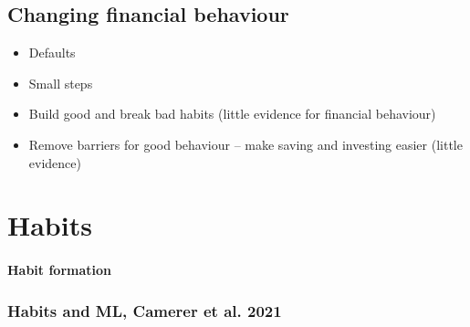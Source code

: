 \documentclass[a4paper, 11pt]{report}
\begin{document}
					\chapter{Changing financial behaviour}

\begin{itemize}
	\item Defaults \citep{thaler2004save,madrian2001power}
	\item Small steps \citep{hershfield2019temporal}
	\item Build good and break bad habits (little evidence for financial behaviour)
	\item Remove barriers for good behaviour -- make saving and investing easier (little evidence)
\end{itemize}








							\part{Habits}


\subsection{Habit formation}

\section{Habits and ML, Camerer et al. 2021}
\end{document}
